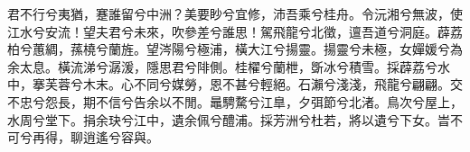 
\begin{pinyinscope}
君不行兮夷猶，蹇誰留兮中洲？美要眇兮宜修，沛吾乘兮桂舟。令沅湘兮無波，使江水兮安流！望夫君兮未來，吹參差兮誰思！駕飛龍兮北徵，邅吾道兮洞庭。薜荔柏兮蕙綢，蓀橈兮蘭旌。望涔陽兮極浦，橫大江兮揚靈。揚靈兮未極，女嬋媛兮為余太息。橫流涕兮潺湲，隱思君兮陫側。桂櫂兮蘭枻，斲冰兮積雪。採薜荔兮水中，搴芙蓉兮木末。心不同兮媒勞，恩不甚兮輕絕。石瀨兮淺淺，飛龍兮翩翩。交不忠兮怨長，期不信兮告余以不閒。鼂騁騖兮江臯，夕弭節兮北渚。鳥次兮屋上，水周兮堂下。捐余玦兮江中，遺余佩兮醴浦。採芳洲兮杜若，將以遺兮下女。旹不可兮再得，聊逍遙兮容與。


\end{pinyinscope}